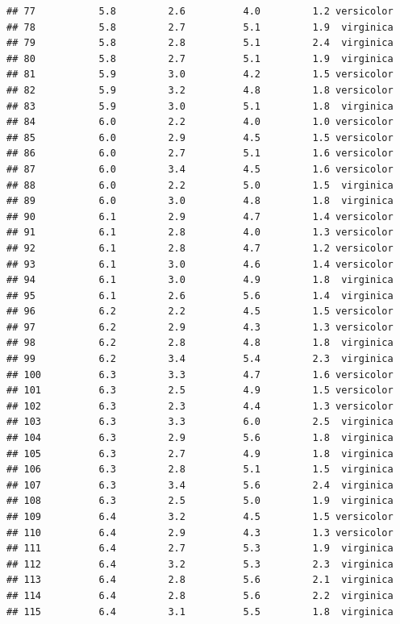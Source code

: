 \documentclass[
]{article}
\begin{document}
\begin{verbatim}
## 77           5.8         2.6          4.0         1.2 versicolor
## 78           5.8         2.7          5.1         1.9  virginica
## 79           5.8         2.8          5.1         2.4  virginica
## 80           5.8         2.7          5.1         1.9  virginica
## 81           5.9         3.0          4.2         1.5 versicolor
## 82           5.9         3.2          4.8         1.8 versicolor
## 83           5.9         3.0          5.1         1.8  virginica
## 84           6.0         2.2          4.0         1.0 versicolor
## 85           6.0         2.9          4.5         1.5 versicolor
## 86           6.0         2.7          5.1         1.6 versicolor
## 87           6.0         3.4          4.5         1.6 versicolor
## 88           6.0         2.2          5.0         1.5  virginica
## 89           6.0         3.0          4.8         1.8  virginica
## 90           6.1         2.9          4.7         1.4 versicolor
## 91           6.1         2.8          4.0         1.3 versicolor
## 92           6.1         2.8          4.7         1.2 versicolor
## 93           6.1         3.0          4.6         1.4 versicolor
## 94           6.1         3.0          4.9         1.8  virginica
## 95           6.1         2.6          5.6         1.4  virginica
## 96           6.2         2.2          4.5         1.5 versicolor
## 97           6.2         2.9          4.3         1.3 versicolor
## 98           6.2         2.8          4.8         1.8  virginica
## 99           6.2         3.4          5.4         2.3  virginica
## 100          6.3         3.3          4.7         1.6 versicolor
## 101          6.3         2.5          4.9         1.5 versicolor
## 102          6.3         2.3          4.4         1.3 versicolor
## 103          6.3         3.3          6.0         2.5  virginica
## 104          6.3         2.9          5.6         1.8  virginica
## 105          6.3         2.7          4.9         1.8  virginica
## 106          6.3         2.8          5.1         1.5  virginica
## 107          6.3         3.4          5.6         2.4  virginica
## 108          6.3         2.5          5.0         1.9  virginica
## 109          6.4         3.2          4.5         1.5 versicolor
## 110          6.4         2.9          4.3         1.3 versicolor
## 111          6.4         2.7          5.3         1.9  virginica
## 112          6.4         3.2          5.3         2.3  virginica
## 113          6.4         2.8          5.6         2.1  virginica
## 114          6.4         2.8          5.6         2.2  virginica
## 115          6.4         3.1          5.5         1.8  virginica

\end{verbatim}
\end{document}
